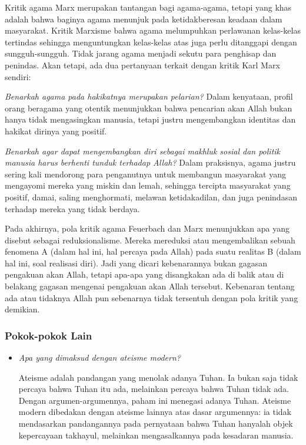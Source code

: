 \documentclass[10pt,a4paper]{article}
\begin{document}
\begin{multicols}{2}
\begin{itemize}
  Kritik agama Marx merupakan tantangan bagi agama-agama, tetapi yang
  khas adalah bahwa baginya agama menunjuk pada ketidakberesan keadaan
  dalam masyarakat. Kritik Marxisme bahwa agama melumpuhkan perlawanan
  kelas-kelas tertindas sehingga menguntungkan kelas-kelas atas juga
  perlu ditanggapi dengan sungguh-sungguh. Tidak jarang agama menjadi
  sekutu para penghisap dan penindas. Akan tetapi, ada dua pertanyaan
  terkait dengan kritik Karl Marx sendiri:

  \emph{Benarkah agama pada hakikatnya merupakan pelarian?} Dalam
  kenyataan, profil orang beragama yang otentik menunjukkan bahwa
  pencarian akan Allah bukan hanya tidak mengasingkan manusia, tetapi
  justru mengembangkan identitas dan hakikat dirinya yang positif.

  \emph{Benarkah agar dapat mengembangkan diri sebagai makhluk sosial
  dan politik manusia harus berhenti tunduk terhadap Allah?} Dalam
  praksisnya, agama justru sering kali mendorong para penganutnya untuk
  membangun masyarakat yang mengayomi mereka yang miskin dan lemah,
  sehingga tercipta masyarakat yang positif, damai, saling menghormati,
  melawan ketidakadilan, dan juga penindasan terhadap mereka yang tidak
  berdaya.

  Pada akhirnya, pola kritik agama Feuerbach dan Marx menunjukkan apa
  yang disebut sebagai reduksionalisme. Mereka mereduksi atau
  mengembalikan sebuah fenomena A (dalam hal ini, hal percaya pada
  Allah) pada suatu realitas B (dalam hal ini, soal realisasi diri).
  Jadi yang dicari kebenarannya bukan gagasan pengakuan akan Allah,
  tetapi apa-apa yang disangkakan ada di balik atau di belakang gagasan
  mengenai pengakuan akan Allah tersebut. Kebenaran tentang ada atau
  tidaknya Allah pun sebenarnya tidak tersentuh dengan pola kritik yang
  demikian.
\end{itemize}

\hypertarget{pokok-pokok-lain-5}{%
\subsubsection{Pokok-pokok Lain}\label{pokok-pokok-lain-5}}

\begin{itemize}
\item
  \emph{Apa yang dimaksud dengan ateisme modern?}

  Ateisme adalah pandangan yang menolak adanya Tuhan. Ia bukan saja
  tidak percaya bahwa Tuhan itu ada, melainkan percaya bahwa Tuhan tidak
  ada. Dengan argumen-argumennya, paham ini menegasi adanya Tuhan.
  Ateisme modern dibedakan dengan ateisme lainnya atas dasar argumennya:
  ia tidak mendasarkan pandangannya pada pernyataan bahwa Tuhan hanyalah
  objek kepercayaan takhayul, melainkan mengasalkannya pada kesadaran
  manusia.


\end{itemize}
\end{multicols}
\end{document}
